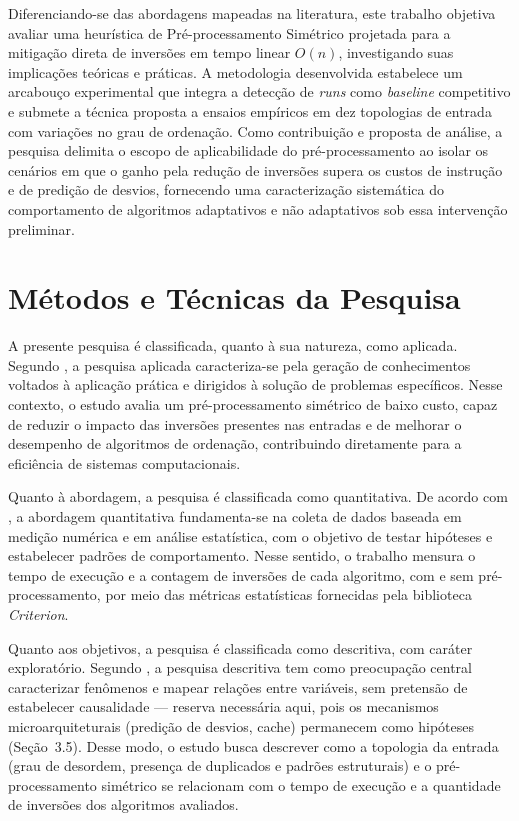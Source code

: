 \documentclass[portuguese]{sbc2025}%
\begin{document}
Diferenciando-se das abordagens mapeadas na literatura, este trabalho objetiva avaliar uma heurística de Pré-processamento Simétrico projetada para a mitigação direta de inversões em tempo linear $O(n)$, investigando suas implicações teóricas e práticas. A metodologia desenvolvida estabelece um arcabouço experimental que integra a detecção de \emph{runs} como \emph{baseline} competitivo e submete a técnica proposta a ensaios empíricos em dez topologias de entrada com variações no grau de ordenação. Como contribuição e proposta de análise, a pesquisa delimita o escopo de aplicabilidade do pré-processamento ao isolar os cenários em que o ganho pela redução de inversões supera os custos de instrução e de predição de desvios, fornecendo uma caracterização sistemática do comportamento de algoritmos adaptativos e não adaptativos sob essa intervenção preliminar.

\section{Métodos e Técnicas da Pesquisa}\label{sec:met}

A presente pesquisa é classificada, quanto à sua natureza, como aplicada. Segundo \citet{gil_metodos_2019}, a pesquisa aplicada caracteriza-se pela geração de conhecimentos voltados à aplicação prática e dirigidos à solução de problemas específicos. Nesse contexto, o estudo avalia um pré-processamento simétrico de baixo custo, capaz de reduzir o impacto das inversões presentes nas entradas e de melhorar o desempenho de algoritmos de ordenação, contribuindo diretamente para a eficiência de sistemas computacionais.

Quanto à abordagem, a pesquisa é classificada como quantitativa. De acordo com \citet{sampieri_metodologia_2021}, a abordagem quantitativa fundamenta-se na coleta de dados baseada em medição numérica e em análise estatística, com o objetivo de testar hipóteses e estabelecer padrões de comportamento. Nesse sentido, o trabalho mensura o tempo de execução e a contagem de inversões de cada algoritmo, com e sem pré-processamento, por meio das métricas estatísticas fornecidas pela biblioteca \emph{Criterion}.

Quanto aos objetivos, a pesquisa é classificada como descritiva, com caráter exploratório. Segundo \citet{gil_metodos_2019}, a pesquisa descritiva tem como preocupação central caracterizar fenômenos e mapear relações entre variáveis, sem pretensão de estabelecer causalidade — reserva necessária aqui, pois os mecanismos microarquiteturais (predição de desvios, cache) permanecem como hipóteses (Seção~3.5). Desse modo, o estudo busca descrever como a topologia da entrada (grau de desordem, presença de duplicados e padrões estruturais) e o pré-processamento simétrico se relacionam com o tempo de execução e a quantidade de inversões dos algoritmos avaliados.
\end{document}
